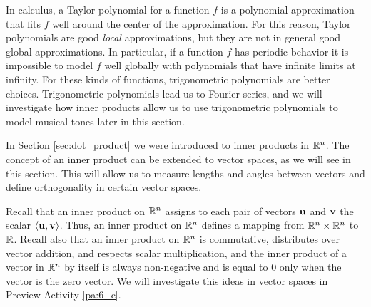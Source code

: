  \label{sec:inner_products}

\vspace*{-17 pt}

\vspace*{13 pt}


In calculus, a Taylor polynomial for a function $f$ is a polynomial approximation that fits $f$ well around the center of the approximation. For this reason, Taylor polynomials are good \emph{local} approximations, but they are not in general good global approximations. In particular, if a function $f$ has periodic behavior it is impossible to model $f$ well globally with polynomials that have infinite limits at infinity. For these kinds of functions, trigonometric polynomials are better choices. Trigonometric polynomials lead us to Fourier series, and we will investigate how inner products allow us to use trigonometric polynomials to model musical tones later in this section. 



In Section \ref{sec:dot_product} we were introduced to inner products in $\mathbb{R}^n$. The concept of an inner product can be extended to vector spaces, as we will see in this section. This will allow us to measure lengths and angles between vectors and define orthogonality in certain vector spaces. 

Recall that an inner product on $\mathbb{R}^n$ assigns to each pair of vectors $\mathbf{u}$ and $\mathbf{v}$ the scalar $\langle \mathbf{u}, \mathbf{v} \rangle$. Thus, an inner product on $\mathbb{R}^n$ defines a mapping from $\mathbb{R}^n \times \mathbb{R}^n$ to $\mathbb{R}$. Recall also that an inner product on $\mathbb{R}^n$ is commutative, distributes over vector addition, and respects scalar multiplication, and the inner product of a vector in $\mathbb{R}^n$  by itself is always non-negative and is equal to 0 only when the vector is the zero vector. We will investigate this ideas in vector spaces in Preview Activity \ref{pa:6_c}.  

